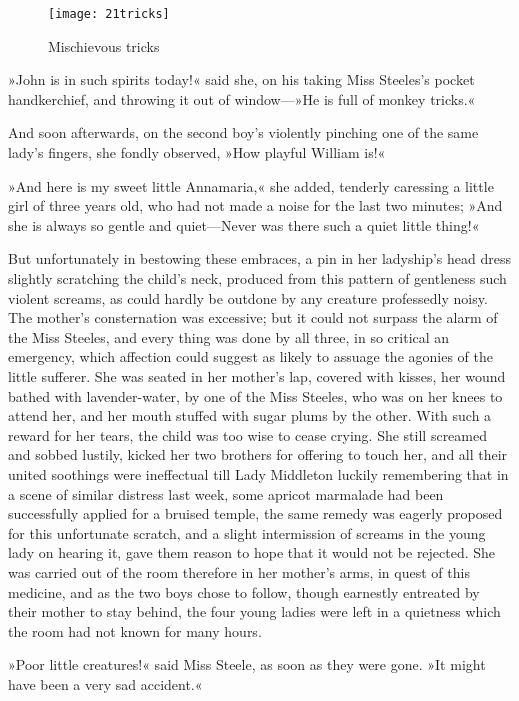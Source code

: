 \begin{figure}[tbph]
\centering
\texttt{[image: 21tricks]}
\caption{Mischievous tricks}
\end{figure}

»John is in such spirits today!« said she, on his taking Miss Steeles’s pocket handkerchief, and throwing it out of window—»He is full of monkey tricks.«

And soon afterwards, on the second boy’s violently pinching one of the same lady’s fingers, she fondly observed, »How playful William is!«

»And here is my sweet little Annamaria,« she added, tenderly caressing a little girl of three years old, who had not made a noise for the last two minutes; »And she is always so gentle and quiet—Never was there such a quiet little thing!«

But unfortunately in bestowing these embraces, a pin in her ladyship’s head dress slightly scratching the child’s neck, produced from this pattern of gentleness such violent screams, as could hardly be outdone by any creature professedly noisy. The mother’s consternation was excessive; but it could not surpass the alarm of the Miss Steeles, and every thing was done by all three, in so critical an emergency, which affection could suggest as likely to assuage the agonies of the little sufferer. She was seated in her mother’s lap, covered with kisses, her wound bathed with lavender-water, by one of the Miss Steeles, who was on her knees to attend her, and her mouth stuffed with sugar plums by the other. With such a reward for her tears, the child was too wise to cease crying. She still screamed and sobbed lustily, kicked her two brothers for offering to touch her, and all their united soothings were ineffectual till Lady Middleton luckily remembering that in a scene of similar distress last week, some apricot marmalade had been successfully applied for a bruised temple, the same remedy was eagerly proposed for this unfortunate scratch, and a slight intermission of screams in the young lady on hearing it, gave them reason to hope that it would not be rejected. She was carried out of the room therefore in her mother’s arms, in quest of this medicine, and as the two boys chose to follow, though earnestly entreated by their mother to stay behind, the four young ladies were left in a quietness which the room had not known for many hours.

»Poor little creatures!« said Miss Steele, as soon as they were gone. »It might have been a very sad accident.«

